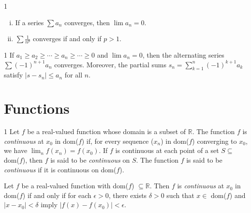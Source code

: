 \newpage

\begin{theo}{1}
	\begin{enumerate}[(i)]
		\item If a series $\sum a_n$ converges, then $\lim a_n = 0$. 
		\item $\sum \frac{1}{n^p}$ converges if and only if $p > 1$. 
	\end{enumerate}
\end{theo}



\begin{theo}{1}
	If $a_1 \geq a_2 \geq \cdots \geq a_n \geq \cdots \geq 0$ and $\lim a_n =0$, then the alternating series $\sum(-1)^{n+1}a_n$ converges. Moreover, the partial sums $s_n = \sum_{k=1}^{n}(-1)^{k+1}a_k$ satisfy $|s-s_n|\leq a_n$ for all $n$.
\end{theo}

\section{Functions}

\begin{defn}{1}
	Let $f$ be a real-valued function whose domain is a subset of $\mathbb{R}$. The function $f$ is \textit{continuous} at $x_0$ in dom($f$) if, for every sequence ($x_n$)	in dom($f$) converging to $x_0$, we have $\lim_n f(x_n) = f(x_0)$. If $f$ is continuous at each point of a set $S \subseteq$ dom($f$), then $f$ is said to	be \textit{continuous} on $S$. The function $f$ is said to be \textit{continuous} if it is continuous on dom($f$).
\end{defn}

\begin{theo}{1}
	Let $f$ be a real-valued function with dom($f$) $\subseteq \mathbb{R}$. Then
	$f$ is \textit{continuous} at $x_0$ in dom($f$) if and only if for each $\epsilon > 0$, there exists $\delta > 0$ such that $x\in$ dom($f$) and $|x-x_0|<\delta$ imply $|f(x)-f(x_0)|<\epsilon$.
\end{theo}



